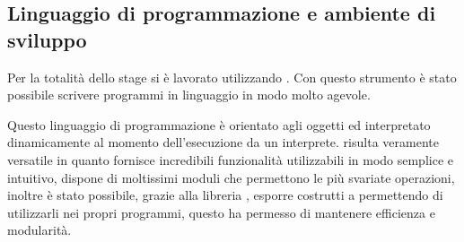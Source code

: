 \subsection{Linguaggio di programmazione e ambiente di sviluppo}
Per la totalità dello stage si è lavorato utilizzando . Con questo strumento è stato possibile scrivere programmi in linguaggio  in modo molto agevole. 

Questo linguaggio di programmazione è orientato agli oggetti ed interpretato dinamicamente al momento dell'esecuzione da un interprete.  risulta veramente versatile in quanto fornisce incredibili funzionalità utilizzabili in modo semplice e intuitivo, dispone di moltissimi moduli che permettono le più svariate operazioni, inoltre è stato possibile, grazie alla libreria , esporre costrutti  a  permettendo di utilizzarli nei propri programmi, questo ha permesso di mantenere efficienza e modularità.

